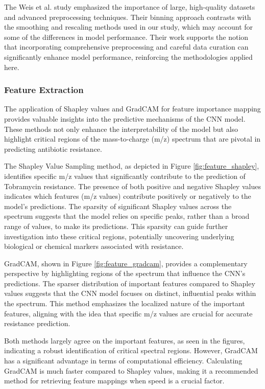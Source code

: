 \documentclass[english,11pt,a4paper,titlepage]{article}
\begin{document}
The Weis et al. study emphasized the importance of large, high-quality datasets and advanced preprocessing techniques. Their binning approach contrasts with the smoothing and rescaling methods used in our study, which may account for some of the differences in model performance. Their work supports the notion that incorporating comprehensive preprocessing and careful data curation can significantly enhance model performance, reinforcing the methodologies applied here.

\subsubsection*{Feature Extraction}
The application of Shapley values and GradCAM for feature importance mapping provides valuable insights into the predictive mechanisms of the CNN model. These methods not only enhance the interpretability of the model but also highlight critical regions of the mass-to-charge (m/z) spectrum that are pivotal in predicting antibiotic resistance.

The Shapley Value Sampling method, as depicted in Figure \ref{fig:feature_shapley}, identifies specific m/z values that significantly contribute to the prediction of Tobramycin resistance. The presence of both positive and negative Shapley values indicates which features (m/z values) contribute positively or negatively to the model's predictions. The sparsity of significant Shapley values across the spectrum suggests that the model relies on specific peaks, rather than a broad range of values, to make its predictions. This sparsity can guide further investigation into these critical regions, potentially uncovering underlying biological or chemical markers associated with resistance.

GradCAM, shown in Figure \ref{fig:feature_gradcam}, provides a complementary perspective by highlighting regions of the spectrum that influence the CNN's predictions. The sparser distribution of important features compared to Shapley values suggests that the CNN model focuses on distinct, influential peaks within the spectrum. This method emphasizes the localized nature of the important features, aligning with the idea that specific m/z values are crucial for accurate resistance prediction.

Both methods largely agree on the important features, as seen in the figures, indicating a robust identification of critical spectral regions. However, GradCAM has a significant advantage in terms of computational efficiency. Calculating GradCAM is much faster compared to Shapley values, making it a recommended method for retrieving feature mappings when speed is a crucial factor.
\end{document}
